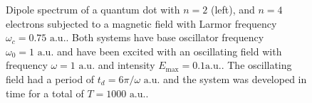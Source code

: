 \begin{figure}[!h]
    \centering
    \caption{Dipole spectrum of a quantum dot with $n=2$ (left), and $n=4$ electrons 
    subjected to a magnetic field with Larmor frequency $\omega_c=0.75 \text{ a.u.}$.
    Both systems have base oscillator frequency $\omega_0=1 \text{ a.u.}$ and 
    have been excited with an oscillating field with frequency $\omega = 1 \text{ a.u.}$
    and intensity $E_\text{max} = 0.1 \text{a.u.}$. The oscillating field had a period of 
    $t_d = 6\pi/\omega \text{ a.u.}$ and the system was developed in time for a total 
    of $T = 1000 \text{ a.u.}$.}
    \label{fig:b_omc075}
\end{figure}

